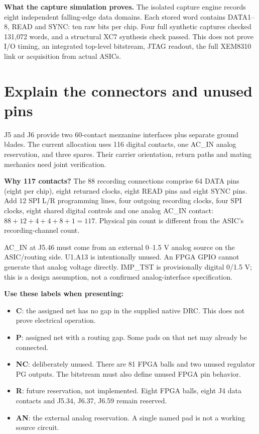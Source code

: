 \documentclass[10pt,a4paper]{article}
\begin{document}
\textbf{What the capture simulation proves.} The isolated capture engine records eight independent falling-edge data domains. Each stored word contains DATA1--8, READ and SYNC: ten raw bits per chip. Four full synthetic captures checked 131,072 words, and a structural XC7 synthesis check passed. This does not prove I/O timing, an integrated top-level bitstream, JTAG readout, the full XEM8310 link or acquisition from actual ASICs.
\section{Explain the connectors and unused pins}
J5 and J6 provide two 60-contact mezzanine interfaces plus separate ground blades. The current allocation uses 116 digital contacts, one AC\_IN analog reservation, and three spares. Their carrier orientation, return paths and mating mechanics need joint verification.

\textbf{Why 117 contacts?} The 88 recording connections comprise 64 DATA pins (eight per chip), eight returned clocks, eight READ pins and eight SYNC pins. Add 12 SPI L/R programming lines, four outgoing recording clocks, four SPI clocks, eight shared digital controls and one analog AC\_IN contact: $88+12+4+4+8+1=117$. Physical pin count is different from the ASIC's recording-channel count.

AC\_IN at J5.46 must come from an external 0--1.5 V analog source on the ASIC/routing side. U1.A13 is intentionally unused. An FPGA GPIO cannot generate that analog voltage directly. IMP\_TST is provisionally digital 0/1.5 V; this is a design assumption, not a confirmed analog-interface specification.

\textbf{Use these labels when presenting:}
\begin{itemize}
\item \textbf{C}: the assigned net has no gap in the supplied native DRC. This does not prove electrical operation.
\item \textbf{P}: assigned net with a routing gap. Some pads on that net may already be connected.
\item \textbf{NC}: deliberately unused. There are 81 FPGA balls and two unused regulator PG outputs. The bitstream must also define unused FPGA pin behavior.
\item \textbf{R}: future reservation, not implemented. Eight FPGA balls, eight J4 data contacts and J5.34, J6.37, J6.59 remain reserved.
\item \textbf{AN}: the external analog reservation. A single named pad is not a working source circuit.
\end{itemize}
\end{document}
